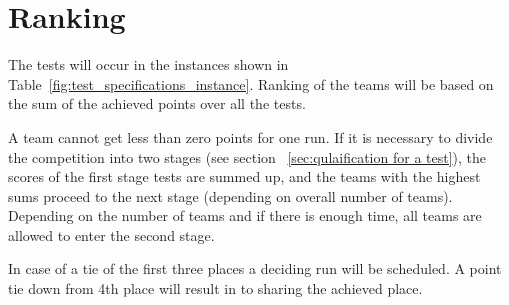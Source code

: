 \section{Ranking}
The tests will occur in the instances shown in Table~\ref{fig:test_specifications_instance}. Ranking of the teams will be based on the sum of the achieved points over all the tests.

A team cannot get less than zero points for one run. If it is necessary to divide the competition into two stages (see section ~\ref{sec:qulaification for a test}), the scores of the first stage tests are summed up, and the teams with the highest sums proceed to the next stage (depending on overall number of teams). Depending on the number of teams and if there is enough time, all teams are allowed to enter the second stage.

In case of a tie of the first three places a deciding run will be scheduled. A point tie down from 4th place will result in to sharing the achieved place. 


%
%
%


